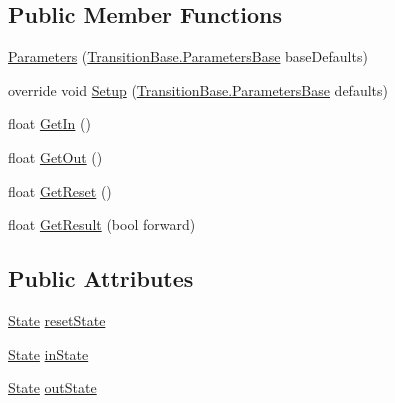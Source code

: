 \subsection*{Public Member Functions}
\begin{DoxyCompactItemize}
\item 
\hyperlink{class_unity_engine_1_1_u_i_1_1_windows_1_1_animations_1_1_window_animation_transition_alpha_1_1_parameters_ab28d5b0ec68460ac1cffaf020ddae4a8}{Parameters} (\hyperlink{class_unity_engine_1_1_u_i_1_1_windows_1_1_animations_1_1_transition_base_1_1_parameters_base}{Transition\+Base.\+Parameters\+Base} base\+Defaults)
\item 
override void \hyperlink{class_unity_engine_1_1_u_i_1_1_windows_1_1_animations_1_1_window_animation_transition_alpha_1_1_parameters_abe1569a00d07a15d3bc64976d1b07779}{Setup} (\hyperlink{class_unity_engine_1_1_u_i_1_1_windows_1_1_animations_1_1_transition_base_1_1_parameters_base}{Transition\+Base.\+Parameters\+Base} defaults)
\item 
float \hyperlink{class_unity_engine_1_1_u_i_1_1_windows_1_1_animations_1_1_window_animation_transition_alpha_1_1_parameters_a0b0b75b93adc67c1067bf89554d796cd}{Get\+In} ()
\item 
float \hyperlink{class_unity_engine_1_1_u_i_1_1_windows_1_1_animations_1_1_window_animation_transition_alpha_1_1_parameters_a682d2da06d18e78dbe2886770fc75132}{Get\+Out} ()
\item 
float \hyperlink{class_unity_engine_1_1_u_i_1_1_windows_1_1_animations_1_1_window_animation_transition_alpha_1_1_parameters_ab53d35e4b225b442f77f6c9bf0c8362f}{Get\+Reset} ()
\item 
float \hyperlink{class_unity_engine_1_1_u_i_1_1_windows_1_1_animations_1_1_window_animation_transition_alpha_1_1_parameters_a1aaa91006161e31c9e45cf7190182fd5}{Get\+Result} (bool forward)
\end{DoxyCompactItemize}
\subsection*{Public Attributes}
\begin{DoxyCompactItemize}
\item 
\hyperlink{class_unity_engine_1_1_u_i_1_1_windows_1_1_animations_1_1_window_animation_transition_alpha_1_1_parameters_1_1_state}{State} \hyperlink{class_unity_engine_1_1_u_i_1_1_windows_1_1_animations_1_1_window_animation_transition_alpha_1_1_parameters_a6ab21ca7f853c85d2a04768af1e9f6d2}{reset\+State}
\item 
\hyperlink{class_unity_engine_1_1_u_i_1_1_windows_1_1_animations_1_1_window_animation_transition_alpha_1_1_parameters_1_1_state}{State} \hyperlink{class_unity_engine_1_1_u_i_1_1_windows_1_1_animations_1_1_window_animation_transition_alpha_1_1_parameters_a7893b2d9b57e7413110a5a4d7b6a41a7}{in\+State}
\item 
\hyperlink{class_unity_engine_1_1_u_i_1_1_windows_1_1_animations_1_1_window_animation_transition_alpha_1_1_parameters_1_1_state}{State} \hyperlink{class_unity_engine_1_1_u_i_1_1_windows_1_1_animations_1_1_window_animation_transition_alpha_1_1_parameters_abecfa40087289af172d81e96c6997369}{out\+State}
\end{DoxyCompactItemize}


